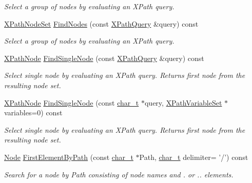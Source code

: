 \begin{DoxyCompactItemize}
\begin{DoxyCompactList}\small\item\em Select a group of nodes by evaluating an XPath query. \item\end{DoxyCompactList}\item 
\hyperlink{classMezzanine_1_1xml_1_1XPathNodeSet}{XPathNodeSet} \hyperlink{classMezzanine_1_1xml_1_1Node_ad9ee673405aca199e92266ec31b8ac3e}{FindNodes} (const \hyperlink{classMezzanine_1_1xml_1_1XPathQuery}{XPathQuery} \&query) const 
\begin{DoxyCompactList}\small\item\em Select a group of nodes by evaluating an XPath query. \item\end{DoxyCompactList}\item 
\hyperlink{classMezzanine_1_1xml_1_1XPathNode}{XPathNode} \hyperlink{classMezzanine_1_1xml_1_1Node_a6b07e3bbd21b2fe87ff2852a74566d3e}{FindSingleNode} (const \hyperlink{classMezzanine_1_1xml_1_1XPathQuery}{XPathQuery} \&query) const 
\begin{DoxyCompactList}\small\item\em Select single node by evaluating an XPath query. Returns first node from the resulting node set. \item\end{DoxyCompactList}\item 
\hyperlink{classMezzanine_1_1xml_1_1XPathNode}{XPathNode} \hyperlink{classMezzanine_1_1xml_1_1Node_af7a59c1099f231f45f640cdcbdcc6362}{FindSingleNode} (const \hyperlink{namespaceMezzanine_1_1xml_a29b8a47c179e9895c4e9e66c45d1dbbc}{char\_\-t} $\ast$query, \hyperlink{classMezzanine_1_1xml_1_1XPathVariableSet}{XPathVariableSet} $\ast$variables=0) const 
\begin{DoxyCompactList}\small\item\em Select single node by evaluating an XPath query. Returns first node from the resulting node set. \item\end{DoxyCompactList}\item 
\hyperlink{classMezzanine_1_1xml_1_1Node}{Node} \hyperlink{classMezzanine_1_1xml_1_1Node_a0cc23e97d5ed9b2c1c46fcb442d8b337}{FirstElementByPath} (const \hyperlink{namespaceMezzanine_1_1xml_a29b8a47c179e9895c4e9e66c45d1dbbc}{char\_\-t} $\ast$Path, \hyperlink{namespaceMezzanine_1_1xml_a29b8a47c179e9895c4e9e66c45d1dbbc}{char\_\-t} delimiter= '/') const 
\begin{DoxyCompactList}\small\item\em Search for a node by Path consisting of node names and . or .. elements. \item\end{DoxyCompactList}\item 

\end{DoxyCompactItemize}
